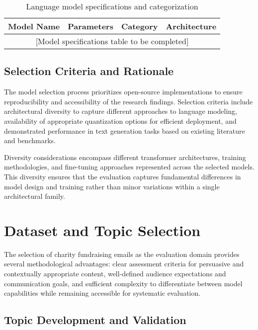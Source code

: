 \begin{table}[htbp]
    \centering
    \caption{Language model specifications and categorization}
    \label{tab:model-specifications}
    \begin{tabular}{|l|l|l|l|}
    \hline
    \textbf{Model Name} & \textbf{Parameters} & \textbf{Category} & \textbf{Architecture} \\
    \hline
    \multicolumn{4}{|c|}{[Model specifications table to be completed]} \\
    \hline
    \end{tabular}
\end{table}

\subsection{Selection Criteria and Rationale}

The model selection process prioritizes open-source implementations to ensure reproducibility and accessibility of the research findings. Selection criteria include architectural diversity to capture different approaches to language modeling, availability of appropriate quantization options for efficient deployment, and demonstrated performance in text generation tasks based on existing literature and benchmarks.

Diversity considerations encompass different transformer architectures, training methodologies, and fine-tuning approaches represented across the selected models. This diversity ensures that the evaluation captures fundamental differences in model design and training rather than minor variations within a single architectural family.

\section{Dataset and Topic Selection}
\label{sec:dataset-topic-selection}

The selection of charity fundraising emails as the evaluation domain provides several methodological advantages: clear assessment criteria for persuasive and contextually appropriate content, well-defined audience expectations and communication goals, and sufficient complexity to differentiate between model capabilities while remaining accessible for systematic evaluation.

\subsection{Topic Development and Validation}

